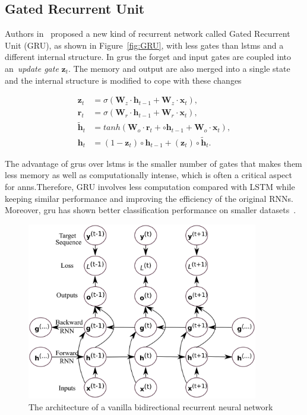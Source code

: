 \subsection{Gated Recurrent Unit}\label{sec:GRU}
Authors in~\cite{Cho_14} proposed a new kind of recurrent network called Gated Recurrent Unit (GRU), as shown in Figure~\ref{fig:GRU}, with less gates than \gls{lstm}s and a different internal structure. In \gls{gru}s the forget and input gates are coupled into an~\emph{update gate} $\mathbf{z}_t$.  The memory and output are also merged into a single state and the internal structure is modified to cope with these changes

\begin{equation}\label{eq:GRU}
\begin{split}
\mathbf{z}_t &= \sigma \left(\mathbf{W}_z \cdot \mathbf{h}_{t-1} +
\mathbf{W}_z \cdot \mathbf{x}_t\right), \\
\mathbf{r}_t &= \sigma \left(\mathbf{W}_r \cdot \mathbf{h}_{t-1} +
\mathbf{W}_r \cdot \mathbf{x}_t\right), \\
\mathbf{\tilde h}_t &= tanh \left(
\mathbf{W}_o \cdot \mathbf{r}_t + \circ \mathbf{h}_{t-1} +
\mathbf{W}_o \cdot \mathbf{x}_t
\right), \\
\mathbf{h}_t &= (1-\mathbf{z}_t) \circ \mathbf{h}_{t-1} +
(\mathbf{z}_t) \circ \mathbf{\tilde h}_t.
\end{split}
\end{equation}

The advantage of \gls{gru}s over \gls{lstm}s is the smaller number of gates that makes them less memory as well as computationally intense, which is often a critical aspect for \gls{ann}s.Therefore, GRU involves less computation compared with LSTM while keeping similar performance and improving the efficiency of the original RNNs. Moreover, \gls{gru} has shown better classification performance on smaller datasets~\cite{Chung_14}.

\begin{figure}[t]
	\centering
	\includegraphics[width=0.9\textwidth]{figures/brnn.eps}
	\caption{The architecture of a vanilla bidirectional recurrent neural network \label{fig:bidirectional_rnn}}
\end{figure}

